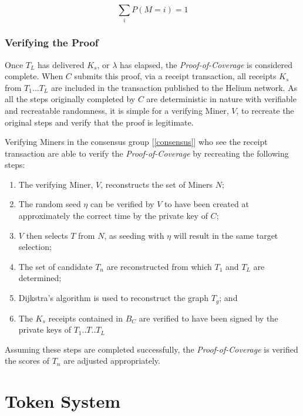 \documentclass[10pt, nonatbib, nocopyrightspace, reprint]{sigplanconf}
\newcommand{\secref}[1]{[\autoref{#1}]}
\begin{document}
\begin{equation*} \label{eq:discrete-probability-distribution}
        \sum_i P(M=i) = 1
\end{equation*}


\subsubsection{Verifying the Proof}

Once $T_L$ has delivered $K_s$, or $\lambda$ has elapsed, the \emph{Proof-of-Coverage} is considered complete. When $C$ submits this proof, via a receipt transaction, all receipts $K_s$ from $T_1$...$T_L$ are included in the transaction published to the Helium network. As all the steps originally completed by $C$ are deterministic in nature with verifiable and recreatable randomness, it is simple for a verifying Miner, $V$, to recreate the original steps and verify that the proof is legitimate.

Verifying Miners in the consensus group \secref{consensus} who see the receipt transaction are able to verify the \emph{Proof-of-Coverage} by recreating the following steps:

\begin{enumerate}
        \item The verifying Miner, $V$, reconstructs the set of Miners $N$;
        \item The random seed $\eta$ can be verified by $V$ to have been created at approximately the correct time by the private key of $C$;
        \item $V$ then selects $T$ from $N$, as seeding with $\eta$ will result in the same target selection;
        \item The set of candidate $T_n$ are reconstructed from which $T_1$ and $T_L$ are determined;
        \item Dijkstra's algorithm is used to reconstruct the graph $T_g$; and
        \item The $K_s$ receipts contained in $B_C$ are verified to have been signed by the private keys of $T_1$..$T$..$T_L$
\end{enumerate}

Assuming these steps are completed successfully, the \emph{Proof-of-Coverage} is verified the scores of $T_n$ are adjusted appropriately.

\section{Token System}\label{tokens}
\end{document}

